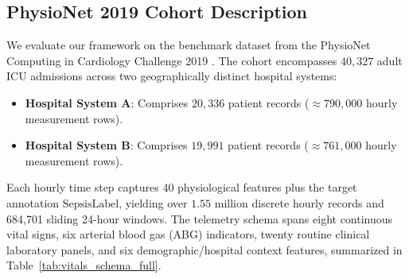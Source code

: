 \documentclass[journal,twocolumn,10pt]{IEEEtran}
\begin{document}
\subsection{PhysioNet 2019 Cohort Description}
We evaluate our framework on the benchmark dataset from the PhysioNet Computing in Cardiology Challenge 2019 \cite{reyna2020physionet}. The cohort encompasses $40,327$ adult ICU admissions across two geographically distinct hospital systems:
\begin{itemize}
    \item \textbf{Hospital System A}: Comprises $20,336$ patient records ($\approx 790,000$ hourly measurement rows).
    \item \textbf{Hospital System B}: Comprises $19,991$ patient records ($\approx 761,000$ hourly measurement rows).
\end{itemize}
Each hourly time step captures 40 physiological features plus the target annotation $\text{SepsisLabel}$, yielding over $1.55$ million discrete hourly records and 684,701 sliding 24-hour windows. The telemetry schema spans eight continuous vital signs, six arterial blood gas (ABG) indicators, twenty routine clinical laboratory panels, and six demographic/hospital context features, summarized in Table~\ref{tab:vitals_schema_full}.
\end{document}
